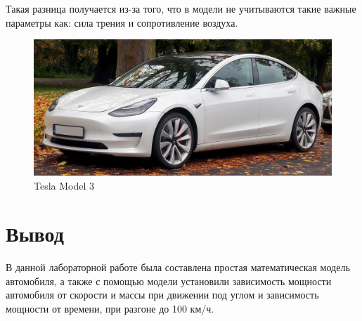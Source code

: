 \documentclass[a4paper, 14pt]{extarticle}
\begin{document}
			Такая разница получается из-за того, что в модели не учитываются такие важные параметры
			как: сила трения и сопротивление воздуха.
			\begin{figure}[H]
				\centering
				\includegraphics[width = \linewidth]{fig4.png}
				\caption[.] {Tesla Model 3}
			\end{figure}
		\section{Вывод}
			В данной лабораторной работе была составлена простая математическая модель автомобиля,
			а также с помощью модели установили зависимость мощности автомобиля от скорости и массы
			при движении под углом и зависимость мощности от времени, при разгоне до 100 км/ч.
\end{document}
